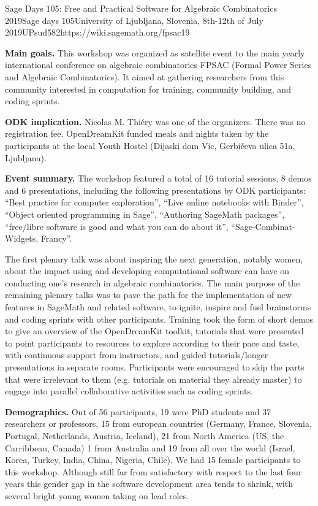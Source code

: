 \begin{event}{Sage Days 105: Free and Practical Software for Algebraic Combinatorics 2019}{Sage days 105}{University of Ljubljana, Slovenia,
8th-12th of July 2019}{UPsud}{58}{2}{https://wiki.sagemath.org/fpsac19}

\textbf{Main goals.} This workshop was organized as satellite event to
the main yearly international conference on algebraic combinatorics
FPSAC (Formal Power Series and Algebraic Combinatorics). It aimed at
gathering researchers from this community interested in computation
for training, community building, and coding sprints.

\textbf{ODK implication.} Nicolas M. Thiéry  was one of the organizers.
There was no registration fee. OpenDreamKit funded meals and nights taken by the participants 
at the local Youth Hostel (Dijaski dom Vic, Gerbičeva ulica 51a, Ljubljana). 

\textbf{Event summary.} The workshop featured a total of 16 tutorial
sessions, 8 demos and 6 presentations, including the following
presentations by ODK participants: ``Best practice for computer
exploration'', ``Live online notebooks with Binder'', ``Object
oriented programming in Sage'', ``Authoring SageMath packages'',
``free/libre software is good and what you can do about it'',
``Sage-Combinat-Widgets, Francy''.

The first plenary talk was about inspiring the next generation,
notably women, about the impact using and developing computational
software can have on conducting one's research in algebraic
combinatorics. The main purpose of the remaining plenary talks was to
pave the path for the implementation of new features in SageMath and
related software, to ignite, inspire and fuel brainstorms and coding
sprints with other participants. Training took the form of short demos
to give an overview of the OpenDreamKit toolkit, tutorials that were
presented to point participants to resources to explore according to
their pace and taste, with continuous support from instructors, and
guided tutorials/longer presentations in separate rooms. Participants
were encouraged to skip the parts that were irrelevant to them (e.g.
tutorials on material they already master) to engage into parallel
collaborative activities such as coding sprints.

\textbf{Demographics.} Out of 56 participants, 19 were PhD students
and 37 researchers or professors, 15 from european countries 
(Germany, France, Slovenia, Portugal, Netherlands, Austria, Iceland), 21 from North America (US, the Carribbean, Canada) 
1 from Australia and 19 from all over the world (Israel, Korea, Turkey, India, China, Nigeria, Chile).
We had 15 female participants to this workshop. Although still far
from satisfactory with respect to the last four years
this gender gap in the software development area tends to shrink, with
several bright young women taking on lead roles.


\end{event}
